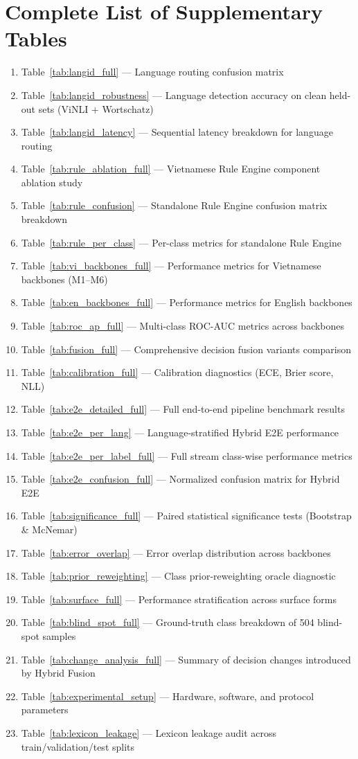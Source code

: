 \documentclass[runningheads]{llncs}
\begin{document}
\section{Complete List of Supplementary Tables}
\begin{enumerate}
\item Table~\ref{tab:langid_full} --- Language routing confusion matrix
\item Table~\ref{tab:langid_robustness} --- Language detection accuracy on clean held-out sets (ViNLI + Wortschatz)
\item Table~\ref{tab:langid_latency} --- Sequential latency breakdown for language routing
\item Table~\ref{tab:rule_ablation_full} --- Vietnamese Rule Engine component ablation study
\item Table~\ref{tab:rule_confusion} --- Standalone Rule Engine confusion matrix breakdown
\item Table~\ref{tab:rule_per_class} --- Per-class metrics for standalone Rule Engine
\item Table~\ref{tab:vi_backbones_full} --- Performance metrics for Vietnamese backbones (M1--M6)
\item Table~\ref{tab:en_backbones_full} --- Performance metrics for English backbones
\item Table~\ref{tab:roc_ap_full} --- Multi-class ROC-AUC metrics across backbones
\item Table~\ref{tab:fusion_full} --- Comprehensive decision fusion variants comparison
\item Table~\ref{tab:calibration_full} --- Calibration diagnostics (ECE, Brier score, NLL)
\item Table~\ref{tab:e2e_detailed_full} --- Full end-to-end pipeline benchmark results
\item Table~\ref{tab:e2e_per_lang} --- Language-stratified Hybrid E2E performance
\item Table~\ref{tab:e2e_per_label_full} --- Full stream class-wise performance metrics
\item Table~\ref{tab:e2e_confusion_full} --- Normalized confusion matrix for Hybrid E2E
\item Table~\ref{tab:significance_full} --- Paired statistical significance tests (Bootstrap \& McNemar)
\item Table~\ref{tab:error_overlap} --- Error overlap distribution across backbones
\item Table~\ref{tab:prior_reweighting} --- Class prior-reweighting oracle diagnostic
\item Table~\ref{tab:surface_full} --- Performance stratification across surface forms
\item Table~\ref{tab:blind_spot_full} --- Ground-truth class breakdown of 504 blind-spot samples
\item Table~\ref{tab:change_analysis_full} --- Summary of decision changes introduced by Hybrid Fusion
\item Table~\ref{tab:experimental_setup} --- Hardware, software, and protocol parameters
\item Table~\ref{tab:lexicon_leakage} --- Lexicon leakage audit across train/validation/test splits
\end{enumerate}
\end{document}
